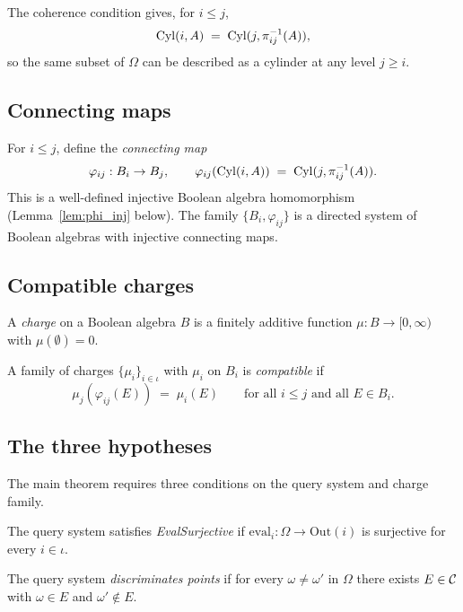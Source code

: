 \begin{remark}
The coherence condition gives, for $i \leq j$,
\[
  \mathrm{Cyl}(i,A) \;=\; \mathrm{Cyl}(j,\pi_{ij}^{-1}(A)),
\]
so the same subset of $\Omega$ can be described as a cylinder at any level $j \geq i$.
\end{remark}

\subsection{Connecting maps}

For $i \leq j$, define the \emph{connecting map}
\[
  \varphi_{ij} : B_i \to B_j, \qquad
  \varphi_{ij}(\mathrm{Cyl}(i,A)) \;=\; \mathrm{Cyl}(j,\pi_{ij}^{-1}(A)).
\]
This is a well-defined injective Boolean algebra homomorphism (Lemma~\ref{lem:phi_inj}
below).  The family $\{B_i, \varphi_{ij}\}$ is a directed system of Boolean algebras
with injective connecting maps.

\subsection{Compatible charges}

\begin{definition}
A \emph{charge} on a Boolean algebra $B$ is a finitely additive function
$\mu : B \to [0,\infty)$ with $\mu(\emptyset) = 0$.

A family of charges $\{\mu_i\}_{i \in \iota}$ with $\mu_i$ on $B_i$ is
\emph{compatible} if
\[
  \mu_j(\varphi_{ij}(E)) \;=\; \mu_i(E)
  \qquad \text{for all } i \leq j \text{ and all } E \in B_i.
\]
\end{definition}

\subsection{The three hypotheses}

The main theorem requires three conditions on the query system and charge family.

\begin{definition}[EvalSurjective]
The query system satisfies \emph{EvalSurjective} if
$\mathrm{eval}_i : \Omega \to \mathrm{Out}(i)$ is surjective for every $i \in \iota$.
\end{definition}

\begin{definition}[Discriminability]
The query system \emph{discriminates points} if for every $\omega \neq \omega'$ in
$\Omega$ there exists $E \in \mathcal{C}$ with $\omega \in E$ and $\omega' \notin E$.
\end{definition}

